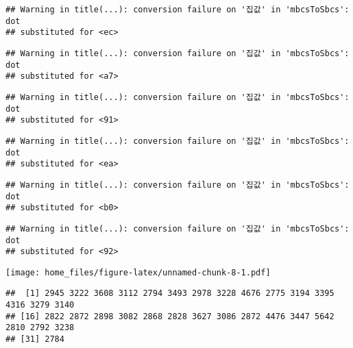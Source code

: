 \documentclass[
]{article}
\newenvironment{Shaded}{\begin{snugshade}}{\end{snugshade}}
\newcommand{\CommentTok}[1]{\textcolor[rgb]{0.56,0.35,0.01}{\textit{#1}}}
\newcommand{\ConstantTok}[1]{\textcolor[rgb]{0.00,0.00,0.00}{#1}}
\newcommand{\FunctionTok}[1]{\textcolor[rgb]{0.00,0.00,0.00}{#1}}
\newcommand{\NormalTok}[1]{#1}
\newcommand{\OtherTok}[1]{\textcolor[rgb]{0.56,0.35,0.01}{#1}}
\newcommand{\SpecialCharTok}[1]{\textcolor[rgb]{0.00,0.00,0.00}{#1}}
\begin{document}
\begin{verbatim}
## Warning in title(...): conversion failure on '집값' in 'mbcsToSbcs': dot
## substituted for <ec>
\end{verbatim}

\begin{verbatim}
## Warning in title(...): conversion failure on '집값' in 'mbcsToSbcs': dot
## substituted for <a7>
\end{verbatim}

\begin{verbatim}
## Warning in title(...): conversion failure on '집값' in 'mbcsToSbcs': dot
## substituted for <91>
\end{verbatim}

\begin{verbatim}
## Warning in title(...): conversion failure on '집값' in 'mbcsToSbcs': dot
## substituted for <ea>
\end{verbatim}

\begin{verbatim}
## Warning in title(...): conversion failure on '집값' in 'mbcsToSbcs': dot
## substituted for <b0>
\end{verbatim}

\begin{verbatim}
## Warning in title(...): conversion failure on '집값' in 'mbcsToSbcs': dot
## substituted for <92>
\end{verbatim}

\texttt{[image: home\_files/figure-latex/unnamed-chunk-8-1.pdf]}

\begin{Shaded}
\end{Shaded}

\begin{verbatim}
##  [1] 2945 3222 3608 3112 2794 3493 2978 3228 4676 2775 3194 3395 4316 3279 3140
## [16] 2822 2872 2898 3082 2868 2828 3627 3086 2872 4476 3447 5642 2810 2792 3238
## [31] 2784
\end{verbatim}

\begin{Shaded}
\end{Shaded}
\end{document}
